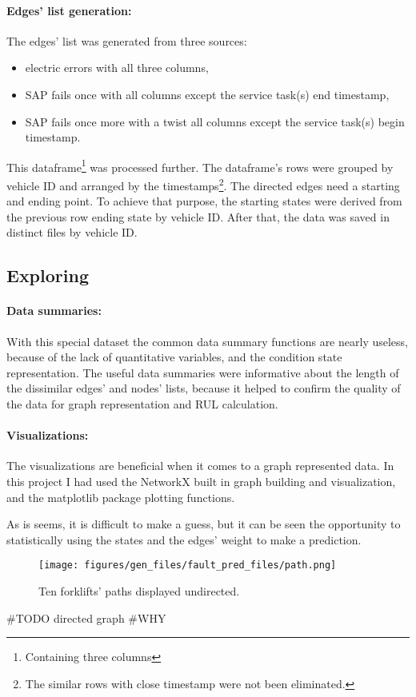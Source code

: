 \paragraph{Edges' list generation:}
The edges' list was generated from three sources: 
\begin{itemize}
	\item{electric errors} with all three columns,
	\item{SAP fails once} with all columns except the service task(s) end timestamp,
	\item{SAP fails once more with a twist} all columns except the service task(s) begin timestamp.
\end{itemize}

This dataframe\footnote{Containing three columns} was processed further. The dataframe's rows were grouped by vehicle ID and arranged by the timestamps\footnote{The similar rows with close timestamp were not been eliminated.}.
The directed edges need a starting and ending point. To achieve that purpose, the starting states were derived from the previous row ending state by vehicle ID. After that, the data was saved in distinct files by vehicle ID.
	\subsection{Exploring}
		\paragraph{Data summaries:}
		With this special dataset the common data summary functions are nearly useless, because of the lack of quantitative variables, and the condition state representation.
		The useful data summaries were informative about the length of the dissimilar edges' and nodes' lists, because it helped to confirm the quality of the data for graph representation and RUL calculation. 

		\paragraph{Visualizations:}
		The visualizations are beneficial when it comes to a graph represented data. In this project I had used the NetworkX built in graph building and visualization, and the matplotlib package plotting functions.

		As is seems, it is difficult to make a guess, but it can be seen the opportunity to statistically using the states and the edges' weight to make a prediction.
			\begin{figure}[H]
			\centering
			\texttt{[image: figures/gen\_files/fault\_pred\_files/path.png]}
			\caption{Ten forklifts' paths displayed undirected.} 
			\end{figure}
		\#TODO directed graph
\#WHY

